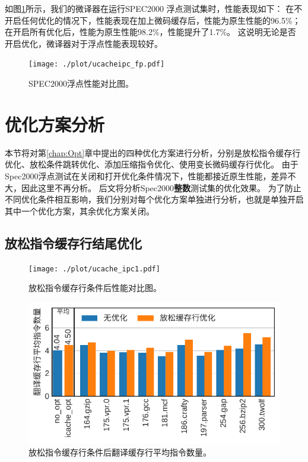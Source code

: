 如图\ref{img:ipc_fp}所示，我们的微译器在运行SPEC2000 浮点测试集时，性能表现如下：
在不开启任何优化的情况下，性能表现在加上微码缓存后，性能为原生性能的96.5\%；
在开启所有优化后，性能为原生性能98.2\%，性能提升了1.7\%。
这说明无论是否开启优化，微译器对于浮点性能表现较好。


\begin{figure}[!htbp]
  \centering
  \texttt{[image: ./plot/ucacheipc\_fp.pdf]}
  \caption{SPEC2000浮点性能对比图。}
  \label{img:ipc_fp}
\end{figure}


\section{优化方案分析}

本节将对第\ref{chap:Opt}章中提出的四种优化方案进行分析，分别是放松指令缓存行优化、放松条件跳转优化、添加压缩指令优化、使用变长微码缓存行优化。
由于Spec2000浮点测试在关闭和打开优化条件情况下，性能都接近原生性能，差异不大，因此这里不再分析。
后文将分析Spec2000\textbf{整数}测试集的优化效果。
为了防止不同优化条件相互影响，我们分别对每个优化方案单独进行分析，也就是单独开启其中一个优化方案，其余优化方案关闭。

\subsection{放松指令缓存行结尾优化}

\begin{figure}[!htbp]
  \centering
  \texttt{[image: ./plot/ucache\_ipc1.pdf]}
  \caption{放松指令缓存行条件后性能对比图。}
  \label{img:ipc1}
\end{figure}

\begin{figure}[!htbp]
  \centering
  \includegraphics[width=0.8\linewidth]{./plot/ucacheline_nums1.pdf}
  \caption{放松指令缓存行条件后翻译缓存行平均指令数量。}
  \label{img:ucacheline_nums1}
\end{figure}

